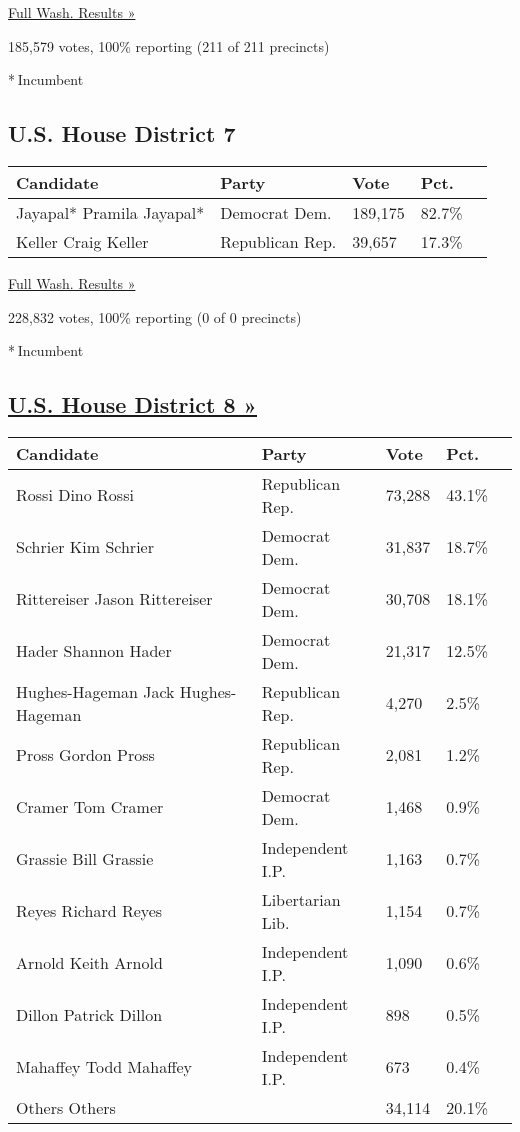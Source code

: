 \href{https://www.nytimes3xbfgragh.onion/elections/results/washington}{Full
Wash. Results »}

185,579 votes, 100\% reporting (211 of 211 precincts)

* Incumbent

\hypertarget{us-house-district-7}{%
\subsection{U.S. House District 7}\label{us-house-district-7}}

\begin{longtable}[]{@{}lllll@{}}
\toprule
Candidate & Party & Vote & Pct. &\tabularnewline
\midrule
\endhead
 Jayapal* Pramila Jayapal* & Democrat Dem. & 189,175 & 82.7\%
&\tabularnewline
 Keller Craig Keller & Republican Rep. & 39,657 & 17.3\%
&\tabularnewline
\bottomrule
\end{longtable}

\href{https://www.nytimes3xbfgragh.onion/elections/results/washington}{Full
Wash. Results »}

228,832 votes, 100\% reporting (0 of 0 precincts)

* Incumbent

\hypertarget{us-house-district-8-}{%
\subsection{\texorpdfstring{\href{https://www.nytimes3xbfgragh.onion/elections/results/washington-house-district-8-primary-election}{U.S.
House District 8
»}}{U.S. House District 8 »}}\label{us-house-district-8-}}

\begin{longtable}[]{@{}lllll@{}}
\toprule
Candidate & Party & Vote & Pct. &\tabularnewline
\midrule
\endhead
 Rossi Dino Rossi & Republican Rep. & 73,288 & 43.1\% &\tabularnewline
 Schrier Kim Schrier & Democrat Dem. & 31,837 & 18.7\% &\tabularnewline
 Rittereiser Jason Rittereiser & Democrat Dem. & 30,708 & 18.1\%
&\tabularnewline
 Hader Shannon Hader & Democrat Dem. & 21,317 & 12.5\% &\tabularnewline
 Hughes-Hageman Jack Hughes-Hageman & Republican Rep. & 4,270 & 2.5\%
&\tabularnewline
 Pross Gordon Pross & Republican Rep. & 2,081 & 1.2\% &\tabularnewline
 Cramer Tom Cramer & Democrat Dem. & 1,468 & 0.9\% &\tabularnewline
 Grassie Bill Grassie & Independent I.P. & 1,163 & 0.7\%
&\tabularnewline
 Reyes Richard Reyes & Libertarian Lib. & 1,154 & 0.7\% &\tabularnewline
 Arnold Keith Arnold & Independent I.P. & 1,090 & 0.6\% &\tabularnewline
 Dillon Patrick Dillon & Independent I.P. & 898 & 0.5\% &\tabularnewline
 Mahaffey Todd Mahaffey & Independent I.P. & 673 & 0.4\%
&\tabularnewline
 Others Others & & 34,114 & 20.1\% &\tabularnewline
\bottomrule
\end{longtable}

